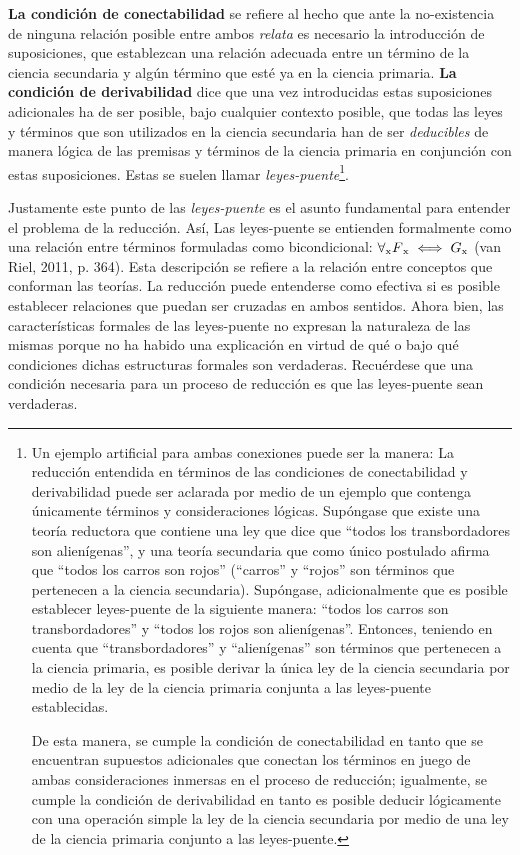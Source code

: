 \documentclass[]{book}
\begin{document}
\textbf{La condición de conectabilidad} se refiere al hecho que ante la
no-existencia de ninguna relación posible entre ambos \emph{relata} es
necesario la introducción de suposiciones, que establezcan una relación
adecuada entre un término de la ciencia secundaria y algún término que
esté ya en la ciencia primaria. \textbf{La condición de derivabilidad}
dice que una vez introducidas estas suposiciones adicionales ha de ser
posible, bajo cualquier contexto posible, que todas las leyes y términos
que son utilizados en la ciencia secundaria han de ser \emph{deducibles}
de manera lógica de las premisas y términos de la ciencia primaria en
conjunción con estas suposiciones. Estas se suelen llamar
\emph{leyes-puente}\footnote{Un ejemplo artificial para ambas conexiones
  puede ser la manera: La reducción entendida en términos de las
  condiciones de conectabilidad y derivabilidad puede ser aclarada por
  medio de un ejemplo que contenga únicamente términos y consideraciones
  lógicas. Supóngase que existe una teoría reductora que contiene una
  ley que dice que ``todos los transbordadores son alienígenas'', y una
  teoría secundaria que como único postulado afirma que ``todos los
  carros son rojos'' (``carros'' y ``rojos'' son términos que pertenecen
  a la ciencia secundaria). Supóngase, adicionalmente que es posible
  establecer leyes-puente de la siguiente manera: ``todos los carros son
  transbordadores'' y ``todos los rojos son alienígenas''. Entonces,
  teniendo en cuenta que ``transbordadores'' y ``alienígenas'' son
  términos que pertenecen a la ciencia primaria, es posible derivar la
  única ley de la ciencia secundaria por medio de la ley de la ciencia
  primaria conjunta a las leyes-puente establecidas.

  De esta manera, se cumple la condición de conectabilidad en tanto que
  se encuentran supuestos adicionales que conectan los términos en juego
  de ambas consideraciones inmersas en el proceso de reducción;
  igualmente, se cumple la condición de derivabilidad en tanto es
  posible deducir lógicamente con una operación simple la ley de la
  ciencia secundaria por medio de una ley de la ciencia primaria
  conjunto a las leyes-puente.}.

Justamente este punto de las \emph{leyes-puente} es el asunto
fundamental para entender el problema de la reducción. Así, Las
leyes-puente se entienden formalmente como una relación entre términos
formuladas como bicondicional: $\forall\textsubscript{x} F\textsubscript{x} \iff
G\textsubscript{x}$ (van Riel, 2011, p. 364). Esta descripción se
refiere a la relación entre conceptos que conforman las teorías. La
reducción puede entenderse como efectiva si es posible establecer
relaciones que puedan ser cruzadas en ambos sentidos. Ahora bien, las
características formales de las leyes-puente no expresan la naturaleza
de las mismas porque no ha habido una explicación en virtud de qué o
bajo qué condiciones dichas estructuras formales son verdaderas.
Recuérdese que una condición necesaria para un proceso de reducción es
que las leyes-puente sean verdaderas.
\end{document}
